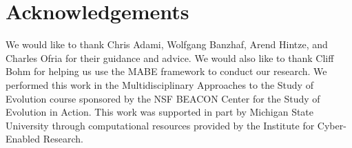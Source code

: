 \section{Acknowledgements}

We would like to thank Chris Adami, Wolfgang Banzhaf, Arend Hintze, and Charles Ofria for their guidance and advice.
We would also like to thank Cliff Bohm for helping us use the MABE framework to conduct our research.
We performed this work in the Multidisciplinary Approaches to the Study of Evolution course sponsored by the NSF BEACON Center for the Study of Evolution in Action.
This work was supported in part by Michigan State University through computational resources provided by the Institute for Cyber-Enabled Research.
